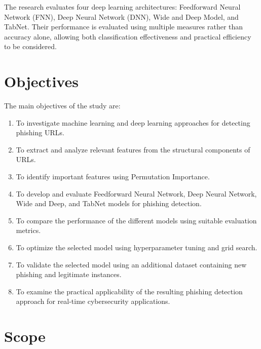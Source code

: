 \documentclass[12pt,a4paper]{report}
\begin{document}
The research evaluates four deep learning architectures:
Feedforward Neural Network (FNN), Deep Neural Network (DNN),
Wide and Deep Model, and TabNet. Their performance is evaluated
using multiple measures rather than accuracy alone, allowing both
classification effectiveness and practical efficiency to be
considered.

\section{Objectives}

The main objectives of the study are:

\begin{enumerate}[label=\arabic*.]

    \item To investigate machine learning and deep learning
    approaches for detecting phishing URLs.

    \item To extract and analyze relevant features from the
    structural components of URLs.

    \item To identify important features using Permutation
    Importance.

    \item To develop and evaluate Feedforward Neural Network,
    Deep Neural Network, Wide and Deep, and TabNet models for
    phishing detection.

    \item To compare the performance of the different models using
    suitable evaluation metrics.

    \item To optimize the selected model using hyperparameter
    tuning and grid search.

    \item To validate the selected model using an additional
    dataset containing new phishing and legitimate instances.

    \item To examine the practical applicability of the resulting
    phishing detection approach for real-time cybersecurity
    applications.

\end{enumerate}

\section{Scope}
\end{document}

